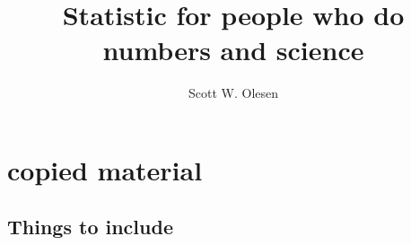 \documentclass{book}
\title{Statistic for people who do numbers and science}
\author{Scott W. Olesen}
\begin{document}
\maketitle

\frontmatter



\mainmatter







\chapter{copied material}

\section{Things to include}\label{things-to-include}
\end{document}
